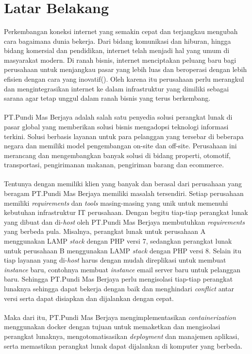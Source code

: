 \documentclass[./bab_1.tex]{subfiles}
\begin{document}
\section{Latar Belakang}
\paragraph*{}Perkembangan koneksi internet yang semakin
cepat dan terjangkau mengubah cara bagaimana dunia bekerja.
Dari bidang komunikasi dan hiburan, hingga bidang komersial
dan pendidikan, internet telah menjadi hal yang umum di
masyarakat modern. Di ranah bisnis, internet menciptakan
peluang baru bagi perusahaan untuk menjangkau pasar yang
lebih luas dan beroperasi dengan lebih
efisien dengan cara yang inovatif(\cite{parinda23}). Oleh
karena itu perusahaan perlu merangkul dan mengintegrasikan
internet ke dalam infrastruktur yang dimiliki sebagai sarana agar
tetap unggul dalam ranah bisnis yang terus berkembang.

\paragraph*{}PT.Pundi Mas Berjaya adalah salah satu penyedia
solusi perangkat lunak di pasar global yang memberikan
solusi bisnis mengadopsi teknologi informasi terkini. Solusi
berbasis layanan untuk para pelanggan yang tersebar di
beberapa negara dan memiliki model pengembangan on-site dan
off-site. Perusahaan ini merancang dan mengembangkan banyak
solusi di bidang properti, otomotif, transportasi,
pengirimanan makanan, pengiriman barang dan ecommerce.

\paragraph*{}Tentunya dengan memiliki klien yang banyak dan
berasal dari perusahaan yang beragam PT.Pundi Mas Berjaya
memiliki masalah tersendiri. Setiap perusahaan memiliki
\textit{requirements} dan \textit{tools} masing-masing yang
unik untuk memenuhi kebutuhan infrastruktur IT perusahaan.
Dengan begitu tiap-tiap perangkat lunak yang dibuat dan
di-\textit{host} oleh PT.Pundi Mas Berjaya membutuhkan
\textit{requirements} yang berbeda pula. Misalnya, perangkat
lunak untuk perusahaan A menggunakan LAMP \textit{stack} dengan PHP versi 7, sedangkan
perangkat lunak untuk perusahaan B menggunakan LAMP
\textit{stack} dengan PHP versi 8.
Selain itu tiap layanan yang di-\textit{host} harus dengan
mudah direplikasi untuk membuat \textit{instance} baru,
contohnya membuat \textit{instance} email server baru untuk
pelanggan baru.
Sehingga PT.Pundi Mas Berjaya perlu mengisolasi tiap-tiap
perangkat lunaknya sehingga dapat bekerja dengan baik dan
menghindari \textit{conflict} antar versi serta dapat
disiapkan dan dijalankan dengan cepat.

\paragraph*{}Maka dari itu, PT.Pundi Mas Berjaya
mengimplementasikan \textit{containerization} menggunakan
docker dengan tujuan untuk memaketkan dan mengisolasi
perangkat lunaknya, mengotomatisasikan \textit{deployment}
dan manajemen aplikasi, serta memastikan perangkat lunak
dapat dijalankan di komputer yang berbeda.
\end{document}
